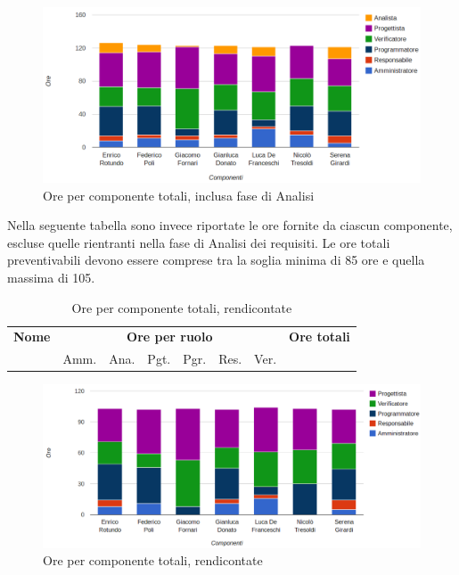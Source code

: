 \begin{figure}[H]
\centering
\includegraphics[scale=0.35]{4-5-1.png}
\caption{Ore per componente totali, inclusa fase di Analisi\label{fig:nome}}
\end{figure}

Nella seguente tabella sono invece riportate le ore fornite da ciascun componente, escluse quelle rientranti nella fase di Analisi dei requisiti. 
Le ore totali preventivabili devono essere comprese tra la soglia minima di 85 ore e quella massima di 105.

\begin{table}[H]
\centering
\begin{tabular}{lccccccc}
\toprule 
    \textbf{Nome}  & \multicolumn{6}{c}{\textbf{Ore per ruolo}} & \textbf{Ore totali}\\
     & Amm. & Ana. & Pgt. & Pgr. & Res. & Ver. \\
    \midrule

    	

    \bottomrule
\end{tabular}
\caption{Ore per componente totali, rendicontate}
\end{table}

\begin{figure}[H]
\centering
\includegraphics[scale=0.35]{4-5-2.png}
\caption{Ore per componente totali, rendicontate\label{fig:nome}}
\end{figure}